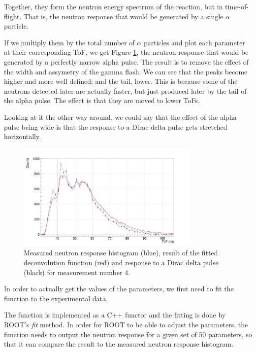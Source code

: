 \documentclass[a4paper,12pt]{report}
\begin{document}
Together, they form the neutron energy spectrum of the reaction, but in time-of-flight.
That is, the neutron response that would be generated by a single $\alpha$ particle.

If we multiply them by the total number of $\alpha$ particles and plot each parameter at their corresponding ToF, we get Figure \ref{pulsed_deconvolution_delta}, the neutron response that would be generated by a perfectly narrow alpha pulse.
The result is to remove the effect of the width and assymetry of the gamma flash.
We can see that the peaks become higher and more well defined; and the tail, lower.
This is because some of the neutrons detected later are actually faster, but just produced later by the tail of the alpha pulse.
The effect is that they are moved to lower ToFs.

Looking at it the other way around, we could say that the effect of the alpha pulse being wide is that the response to a Dirac delta pulse gets stretched horizontally.
\\

\begin{figure}[H]
	\centering
	\includegraphics[width=0.80\textwidth]{pulsed_deconvolution_delta.png}
	\caption{Measured neutron response histogram (blue), result of the fitted deconvolution function (red) and response to a Dirac delta pulse (black) for measurement number 4.}
	\label{pulsed_deconvolution_delta}
\end{figure}

In order to actually get the values of the parameters, we first need to fit the function to the experimental data.

The function is implemented as a C++ functor and the fitting is done by ROOT's \textit{fit} method.
In order for ROOT to be able to adjust the parameters, the function needs to output the neutron response for a given set of 50 parameters, so that it can compare the result to the measured neutron response histogram.
\end{document}
